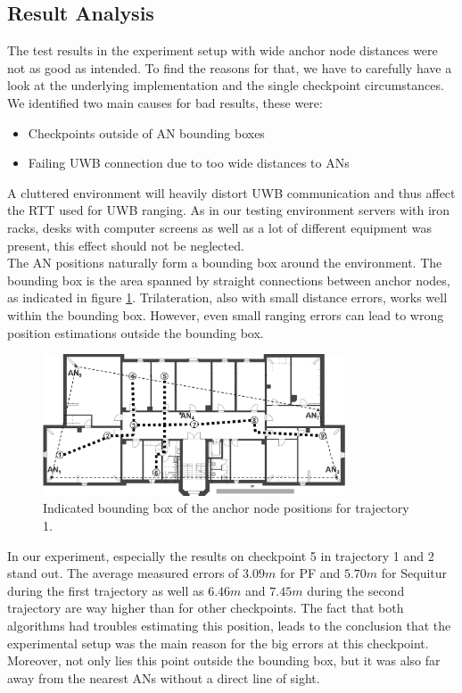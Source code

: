 \subsection{Result Analysis}
\label{Section2}
The test results in the experiment setup with wide anchor node distances were not as good as intended. To find the reasons for that, we have to carefully have a look at the underlying implementation and the single checkpoint circumstances. We identified two main causes for bad results, these were:
\begin{itemize}
\item Checkpoints outside of AN bounding boxes
\item Failing UWB connection due to too wide distances to ANs
\end{itemize}
A cluttered environment will heavily distort UWB communication and thus affect the RTT used for UWB ranging. As in our testing environment servers with iron racks, desks with computer screens as well as a lot of different equipment was present, this effect should not be neglected.\\
\noindent\hspace*{5mm}%
The AN positions naturally form a bounding box around the environment. The bounding box is the area spanned by straight connections between anchor nodes, as indicated in figure \ref{fig:trajectory1_boundingBox}. Trilateration, also with small distance errors, works well within the bounding box. However, even small ranging errors can lead to wrong position estimations outside the bounding box. 
\begin{figure}[th]
\centering
\includegraphics[width=0.8\textwidth]{Figures/trajectory1_boundingBox}
\decoRule
\caption[Bounding Box and Checkpoints for Trajectory 1 ]{Indicated bounding box of the anchor node positions for trajectory 1.}
\label{fig:trajectory1_boundingBox}
\end{figure}
In our experiment, especially the results on checkpoint 5 in trajectory 1 and 2 stand out. The average measured errors of $3.09m$ for PF and $5.70m$ for Sequitur during the first trajectory as well as $6.46m$ and $7.45m$ during the second trajectory are way higher than for other checkpoints. The fact that both algorithms had troubles estimating this position, leads to the conclusion that the experimental setup was the main reason for the big errors at this checkpoint. Moreover, not only lies this point outside the bounding box, but it was also far away from the nearest ANs without a direct line of sight.\\
